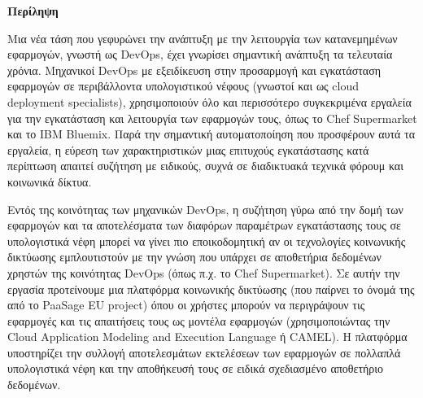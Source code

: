 \thispagestyle{empty}
\begin{titlepage}
\begin{center}
{\bf\Large{Περίληψη}}\\
\end{center}

\indent  

Μια νέα τάση που γεφυρώνει την ανάπτυξη με την λειτουργία των κατανεμημένων εφαρμογών, γνωστή ως DevOps, έχει γνωρίσει σημαντική ανάπτυξη τα τελευταία χρόνια. Μηχανικοί DevOps με εξειδίκευση στην προσαρμογή και εγκατάσταση εφαρμογών σε περιβάλλοντα υπολογιστικού νέφους (γνωστοί και ως cloud deployment specialists), χρησιμοποιούν όλο και περισσότερο συγκεκριμένα εργαλεία για την εγκατάσταση και λειτουργία των εφαρμογών τους, όπως το Chef Supermarket και το IBM Bluemix. Παρά την σημαντική αυτοματοποίηση που προσφέρουν αυτά τα εργαλεία, η εύρεση των χαρακτηριστικών μιας επιτυχούς εγκατάστασης κατά περίπτωση απαιτεί συζήτηση με ειδικούς, συχνά σε διαδικτυακά τεχνικά φόρουμ και κοινωνικά δίκτυα.

Εντός της κοινότητας των μηχανικών DevOps, η συζήτηση γύρω από την δομή των εφαρμογών και τα αποτελέσματα των διαφόρων παραμέτρων εγκατάστασης τους σε υπολογιστικά νέφη μπορεί να γίνει πιο εποικοδομητική αν οι τεχνολογίες κοινωνικής δικτύωσης εμπλουτιστούν με την γνώση που υπάρχει σε αποθετήρια δεδομένων χρηστών της κοινότητας DevOps (όπως π.χ. το Chef Supermarket). Σε αυτήν την εργασία προτείνουμε μια πλατφόρμα κοινωνικής δικτύωσης (που παίρνει το όνομά της από το PaaSage EU project) όπου οι χρήστες μπορούν να περιγράψουν τις εφαρμογές και τις απαιτήσεις τους ως μοντέλα εφαρμογών (χρησιμοποιώντας την Cloud Application Modeling and Execution Language ή CAMEL). Η πλατφόρμα υποστηρίζει την συλλογή αποτελεσμάτων εκτελέσεων των εφαρμογών σε πολλαπλά υπολογιστικά νέφη και την αποθήκευσή τους σε ειδικά σχεδιασμένο αποθετήριο δεδομένων.


\end{titlepage}
